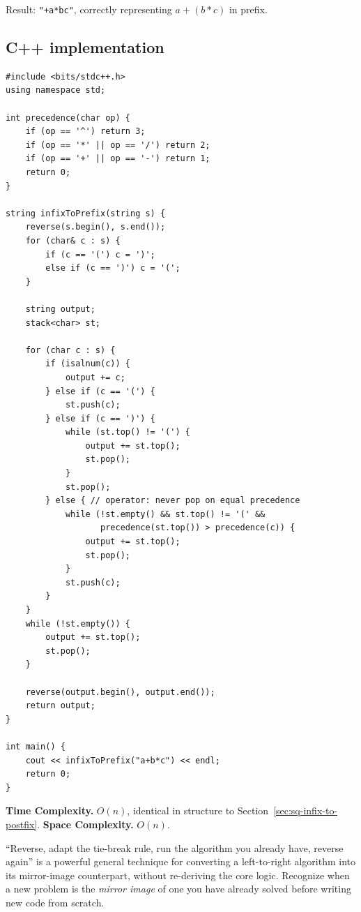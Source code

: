 Result: \texttt{"+a*bc"}, correctly representing $a+(b*c)$ in prefix.

\subsection*{C++ implementation}

\begin{lstlisting}
#include <bits/stdc++.h>
using namespace std;

int precedence(char op) {
    if (op == '^') return 3;
    if (op == '*' || op == '/') return 2;
    if (op == '+' || op == '-') return 1;
    return 0;
}

string infixToPrefix(string s) {
    reverse(s.begin(), s.end());
    for (char& c : s) {
        if (c == '(') c = ')';
        else if (c == ')') c = '(';
    }

    string output;
    stack<char> st;

    for (char c : s) {
        if (isalnum(c)) {
            output += c;
        } else if (c == '(') {
            st.push(c);
        } else if (c == ')') {
            while (st.top() != '(') {
                output += st.top();
                st.pop();
            }
            st.pop();
        } else { // operator: never pop on equal precedence
            while (!st.empty() && st.top() != '(' &&
                   precedence(st.top()) > precedence(c)) {
                output += st.top();
                st.pop();
            }
            st.push(c);
        }
    }
    while (!st.empty()) {
        output += st.top();
        st.pop();
    }

    reverse(output.begin(), output.end());
    return output;
}

int main() {
    cout << infixToPrefix("a+b*c") << endl;
    return 0;
}
\end{lstlisting}

\begin{complexitybox}
\textbf{Time Complexity.} $O(n)$, identical in structure to
Section~\ref{sec:sq-infix-to-postfix}.
\textbf{Space Complexity.} $O(n)$.
\end{complexitybox}

\begin{takeawaybox}
``Reverse, adapt the tie-break rule, run the algorithm you already have,
reverse again'' is a powerful general technique for converting a
left-to-right algorithm into its mirror-image counterpart, without
re-deriving the core logic. Recognize when a new problem is the
\emph{mirror image} of one you have already solved before writing new
code from scratch.
\end{takeawaybox}
